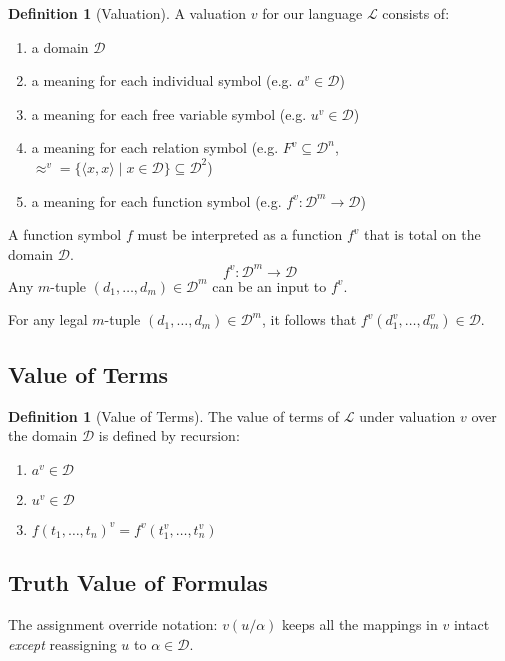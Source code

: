 \documentclass[11pt]{article}
\theoremstyle{definition}
\newtheorem{defn}[thm]{Definition}
\begin{document}
\begin{defn}[Valuation]
A valuation $v$ for our language $\mathcal{L}$ consists of:\vspace{-0.25cm}
\begin{enumerate}
    \item a domain $\mathcal{D}$
    \item a meaning for each individual symbol (e.g. $a^v \in \mathcal{D}$)
    \item a meaning for each free variable symbol (e.g. $u^v \in \mathcal{D}$)
    \item a meaning for each relation symbol (e.g. $F^v \subseteq \mathcal{D}^n$, $\approx^v = \{\langle x, x \rangle \mid x \in \mathcal{D}\} \subseteq \mathcal{D}^2$)
    \item a meaning for each function symbol (e.g. $f^v : \mathcal{D}^m \to \mathcal{D}$)
\end{enumerate}
\end{defn}

A function symbol $f$ must be interpreted as a function $f^v$ that is total on the domain $\mathcal{D}$.
$$f^v : \mathcal{D}^m \to \mathcal{D}$$
Any $m$-tuple $(d_1, \dots, d_m) \in \mathcal{D}^m$ can be an input to $f^v$.

For any legal $m$-tuple $(d_1, \dots, d_m) \in \mathcal{D}^m$, it follows that $f^v (d_1^v, \dots, d_m^v) \in \mathcal{D}$.

\subsection{Value of Terms}
\begin{defn}[Value of Terms]
The value of terms of $\mathcal{L}$ under valuation $v$ over the domain $\mathcal{D}$ is defined by recursion:\vspace{-0.25cm}
\begin{enumerate}
    \item $a^v \in \mathcal{D}$
    \item $u^v \in \mathcal{D}$
    \item $f(t_1, \dots, t_n)^v = f^v(t_1^v, \dots, t_n^v)$
\end{enumerate}
\end{defn}

\subsection{Truth Value of Formulas}

The assignment override notation: $v(u/\alpha)$ keeps all the mappings in $v$ intact {\it except} reassigning $u$ to $\alpha \in \mathcal{D}$.
\end{document}
